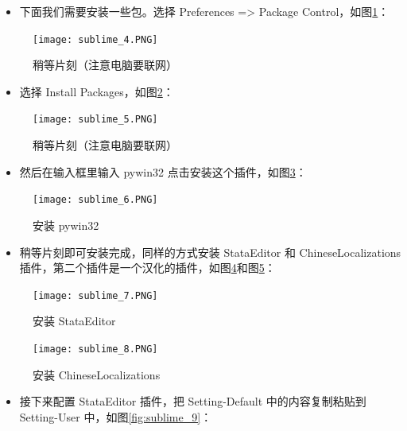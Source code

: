 \documentclass[cn,fancy,blue,11pt]{elegantbook}
\begin{document}
\begin{itemize}
  \item 下面我们需要安装一些包。选择 Preferences =\textgreater{} Package Control，如图\ref{fig:sublime_4}：
\end{itemize}

\begin{figure}[htbp]
  \centering
  \texttt{[image: sublime\_4.PNG]}
  \caption{稍等片刻（注意电脑要联网）}
  \label{fig:sublime_4}
\end{figure}

\begin{itemize}
  \item 选择 Install Packages，如图\ref{fig:sublime_5}：
\end{itemize}

\begin{figure}[htbp]
  \centering
  \texttt{[image: sublime\_5.PNG]}
  \caption{稍等片刻（注意电脑要联网）}
  \label{fig:sublime_5}
\end{figure}

\begin{itemize}
  \item 然后在输入框里输入 pywin32 点击安装这个插件，如图\ref{fig:sublime_6}：
\end{itemize}

\begin{figure}[htbp]
  \centering
  \texttt{[image: sublime\_6.PNG]}
  \caption{安装 pywin32}
  \label{fig:sublime_6}
\end{figure}

\begin{itemize}
  \item 稍等片刻即可安装完成，同样的方式安装 StataEditor 和 ChineseLocalizations 插件，第二个插件是一个汉化的插件，如图\ref{fig:sublime_7}和图\ref{fig:sublime_8}：
\end{itemize}

\begin{figure}[htbp]
  \centering
  \texttt{[image: sublime\_7.PNG]}
  \caption{安装 StataEditor}
  \label{fig:sublime_7}
\end{figure}

\begin{figure}[htbp]
  \centering
  \texttt{[image: sublime\_8.PNG]}
  \caption{安装 ChineseLocalizations}
  \label{fig:sublime_8}
\end{figure}

\begin{itemize}
  \item 接下来配置 StataEditor 插件，把 Setting-Default 中的内容复制粘贴到 Setting-User 中，如图\ref{fig:sublime_9}：
\end{itemize}
\end{document}
